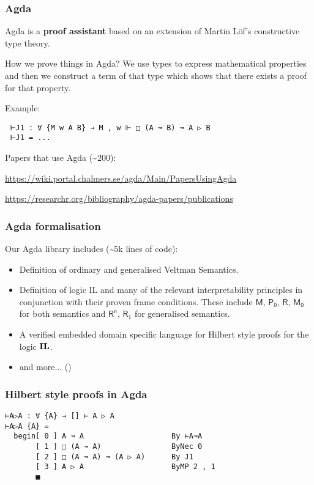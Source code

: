\documentclass{beamer}
\newcommand{\prin}[1]{\ensuremath{\textbf{\textup{#1}}}\xspace}
\newcommand{\il}{\prin{IL}}
\newcommand{\principle}[1]{\text{$\mathsf{#1}$}}
\begin{document}
\begin{frame}[fragile]
  \frametitle{Agda}
  Agda is a \textbf{proof assistant} based on an extension of Martin Löf's constructive
  type theory.

  \pause
  How we prove things in Agda? We use types to express mathematical properties
  and then we construct a term of that type which shows that there exists a proof
  for that property.

  \pause
  Example:
\begin{verbatim}
 ⊩J1 : ∀ {M w A B} → M , w ⊩ □ (A ↝ B) ↝ A ▷ B
 ⊩J1 = ...
\end{verbatim}

  \vspace{0.3cm}
  \pause
  Papers that use Agda (\textasciitilde 200):

  \url{https://wiki.portal.chalmers.se/agda/Main/PapersUsingAgda}

  \vspace{0.3cm}

  \url{https://researchr.org/bibliography/agda-papers/publications}
\end{frame}


\begin{frame}
  \frametitle{Agda formalisation}
  Our Agda library includes (\textasciitilde 5k lines of code):
  \begin{itemize}
  \item Definition of ordinary and generalised Veltman Semantics.
  \item Definition of logic IL and many of the relevant interpretability
    principles in conjunction with their proven frame conditions. These include
    $\principle{M}$, $\principle{P_0}$, $\principle{R}$, $\principle{M_0}$ for
    both semantics and $\principle{R^n}$, $\principle{R_1}$ for generalised
    semantics.
  \item A verified embedded domain specific language for Hilbert style proofs
    for the logic \il.
  \item and more... (\cite{MasRovira:2020:MastersThesis})
  \end{itemize}
\end{frame}

\begin{frame}[fragile]
  \frametitle{Hilbert style proofs in Agda}
\begin{verbatim}
⊢A▷A : ∀ {A} → [] ⊢ A ▷ A
⊢A▷A {A} =
  begin[ 0 ] A ↝ A                    By ⊢A↝A
       [ 1 ] □ (A ↝ A)                ByNec 0
       [ 2 ] □ (A ↝ A) ↝ (A ▷ A)      By J1
       [ 3 ] A ▷ A                    ByMP 2 , 1
       ■
\end{verbatim}
\end{frame}
\end{document}
